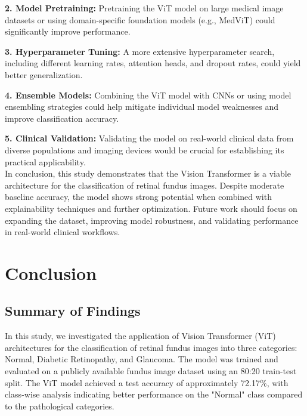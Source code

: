 \documentclass[a4paper,12pt]{report}
\begin{document}
\textbf{2. Model Pretraining:} Pretraining the ViT model on large medical image datasets or using domain-specific foundation models (e.g., MedViT) could significantly improve performance.

\textbf{3. Hyperparameter Tuning:} A more extensive hyperparameter search, including different learning rates, attention heads, and dropout rates, could yield better generalization.

\textbf{4. Ensemble Models:} Combining the ViT model with CNNs or using model ensembling strategies could help mitigate individual model weaknesses and improve classification accuracy.

\textbf{5. Clinical Validation:} Validating the model on real-world clinical data from diverse populations and imaging devices would be crucial for establishing its practical applicability.\\


In conclusion, this study demonstrates that the Vision Transformer is a viable architecture for the classification of retinal fundus images. Despite moderate baseline accuracy, the model shows strong potential when combined with explainability techniques and further optimization. Future work should focus on expanding the dataset, improving model robustness, and validating performance in real-world clinical workflows.

\chapter{Conclusion}

\section{Summary of Findings}

In this study, we investigated the application of Vision Transformer (ViT) architectures for the classification of retinal fundus images into three categories: Normal, Diabetic Retinopathy, and Glaucoma. The model was trained and evaluated on a publicly available fundus image dataset using an 80:20 train-test split. The ViT model achieved a test accuracy of approximately 72.17\%, with class-wise analysis indicating better performance on the "Normal" class compared to the pathological categories.
\end{document}
